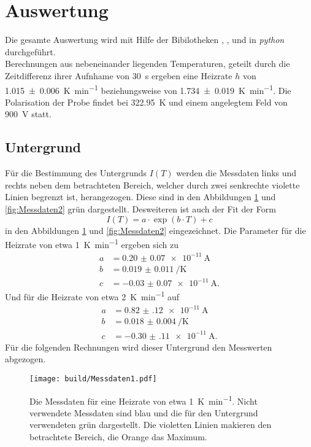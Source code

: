 \newpage
\section{Auswertung}
\label{sec:Auswertung}
Die gesamte Auswertung wird mit Hilfe der Bibilotheken \cite{matplotlib}, \cite{numpy}, \cite{scipy} und
\cite{uncertainties} in \textit{python} durchgeführt. \\
Berechnungen aus nebeneinander liegenden Temperaturen, geteilt durch die Zeitdifferenz ihrer Aufnhame von \SI{30}{\second}
ergeben eine Heizrate $h$ von \SI{1.015(6)}{\kelvin\per\minute} beziehungsweise von \SI{1.734(19)}{\kelvin\per\minute}.
Die Polarisation der Probe findet bei \SI{322.95}{\kelvin} und einem angelegtem Feld von \SI{900}{\volt} statt.

\subsection{Untergrund}
\label{sec:Unter}
Für die Bestimmung des Untergrunds $I(T)$ werden die Messdaten links und rechts neben dem betrachteten Bereich,
welcher durch zwei senkrechte violette Linien begrenzt ist, 
herangezogen. Diese sind in den Abbildungen \ref{fig:Messdaten1} und \ref{fig:Messdaten2} grün dargestellt.
Desweiteren ist auch der Fit der Form
\begin{equation}
    \label{eqn:exp}
    I(T) = a \cdot \exp \left(b\cdot T \right) + c
\end{equation}
in den Abbildungen \ref{fig:Messdaten1} und \ref{fig:Messdaten2} eingezeichnet.
Die Parameter für die Heizrate von etwa \SI{1}{\kelvin\per\minute} ergeben sich zu
\begin{align*}
    a &= \SI{0.20(7)e-11}{\ampere} \\
    b &= \SI{0.019(11)}{\per\kelvin} \\
    c &= \SI{-0.03(7)e-11}{\ampere}.
\end{align*}
Und für die Heizrate von etwa \SI{2}{\kelvin\per\minute} auf
\begin{align*}
    a &= \SI{0.82(12)e-11}{\ampere} \\
    b &= \SI{0.018(4)}{\per\kelvin} \\
    c &= \SI{-0.30(11)e-11}{\ampere}.
\end{align*}
Für die folgenden Rechnungen wird dieser Untergrund den Messwerten abgezogen.
\begin{figure}[htb]
  \centering
  \texttt{[image: build/Messdaten1.pdf]}
  \caption{Die Messdaten für eine Heizrate von etwa \SI{1}{\kelvin\per\minute}. Nicht verwendete Messdaten sind blau und die für den Untergrund verwendeten grün dargestellt. Die violetten Linien makieren den betrachtete Bereich, die Orange das Maximum.}
  \label{fig:Messdaten1}
\end{figure}
